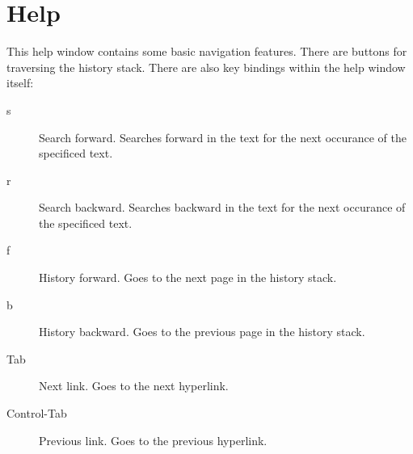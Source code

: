 \chapter{Help}

This help window contains some basic navigation features.  There are
buttons for traversing the history stack.  There are also key bindings
within the help window itself:

\begin{description}
\item[s] Search forward.  Searches forward in the text for the next
occurance of the specificed text.
\item[r] Search backward.  Searches backward in the text for the next
occurance of the specificed text.
\item[f] History forward.  Goes to the next page in the history stack.
\item[b] History backward. Goes to the previous page in the history
stack.
\item[Tab] Next link. Goes to the next hyperlink.
\item[Control-Tab] Previous link. Goes to the previous hyperlink.
\end{description}



